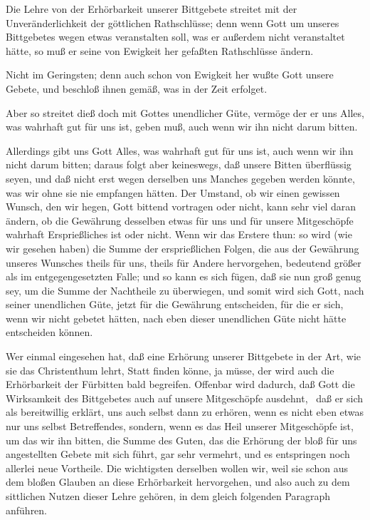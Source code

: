 \begin{aufza}
 Die Lehre von der Erhörbarkeit unserer Bittgebete streitet mit der Unveränderlichkeit der göttlichen Rathschlüsse; denn wenn Gott um unseres Bittgebetes wegen etwas veranstalten soll, was er außerdem nicht veranstaltet hätte, so muß er seine von Ewigkeit her gefaßten Rathschlüsse ändern.\par
{} Nicht im Geringsten; denn auch schon von Ewigkeit her wußte Gott unsere Gebete, und beschloß ihnen gemäß, was in der Zeit erfolget.~\par
{} Aber so streitet dieß doch mit Gottes unendlicher Güte, vermöge der er uns Alles, was wahrhaft gut für uns ist, geben muß, auch wenn wir ihn nicht darum bitten.\par
{} Allerdings gibt uns Gott Alles, was wahrhaft gut für uns ist, auch wenn wir ihn nicht darum bitten; daraus folgt aber keineswegs, daß unsere Bitten überflüssig seyen, und daß nicht erst wegen derselben uns Manches gegeben werden könnte, was wir ohne sie nie empfangen hätten. Der Umstand, ob wir einen gewissen Wunsch, den wir hegen, Gott bittend vortragen oder nicht, kann sehr viel daran ändern, ob die Gewährung desselben etwas für uns und für unsere Mitgeschöpfe wahrhaft Ersprießliches ist oder nicht. Wenn wir das Erstere thun: so wird (wie wir gesehen haben) die Summe der ersprießlichen Folgen, die aus der Gewährung unseres Wunsches theils für uns, theils für Andere hervorgehen, bedeutend größer als im entgegengesetzten Falle; und so kann es sich fügen, daß sie nun groß genug sey, um die Summe der Nachtheile zu überwiegen, und somit wird sich Gott, nach seiner unendlichen Güte, jetzt für die Gewährung entscheiden, für die er sich, wenn wir nicht gebetet hätten, nach eben dieser unendlichen Güte nicht hätte entscheiden können.
\item Wer einmal eingesehen hat, daß eine Erhörung unserer Bittgebete in der Art, wie sie das Christenthum lehrt, Statt finden könne, ja müsse, der wird auch die Erhörbarkeit der Fürbitten bald begreifen. Offenbar wird dadurch, daß Gott die Wirksamkeit des Bittgebetes auch auf unsere Mitgeschöpfe ausdehnt, \dh\ daß er sich als bereitwillig erklärt, uns auch selbst dann zu erhören, wenn es nicht eben etwas nur uns selbst Betreffendes, sondern, wenn es das Heil unserer Mitgeschöpfe ist, um das wir ihn bitten, die Summe des Guten, das die Erhörung der bloß für uns angestellten Gebete mit sich führt, gar sehr vermehrt, und es entspringen noch allerlei neue Vortheile. Die wichtigsten derselben wollen wir, weil sie schon aus dem bloßen Glauben an diese Erhörbarkeit hervorgehen, und also auch zu dem sittlichen Nutzen dieser Lehre gehören, in dem gleich folgenden Paragraph anführen.~\par

\end{aufza}
